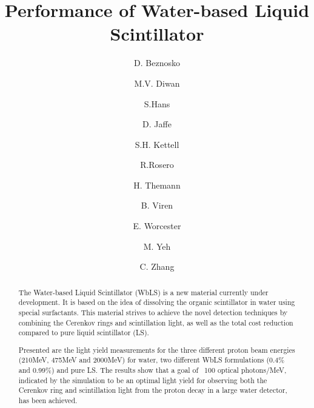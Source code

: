 \documentclass[preprint,12pt]{elsarticle}
\begin{document}
\begin{frontmatter}






\title{Performance of Water-based Liquid Scintillator}

 \author[label1]{D. Beznosko}
\author[label2]{M.V. Diwan}
\author[label3]{S.Hans}
\author[label2]{D. Jaffe}
\author[label2]{S.H. Kettell}
\author[label3]{R.Rosero}
\author[label2]{H. Themann}
\author[label2]{B. Viren}
\author[label2]{E. Worcester}
\author[label3]{M. Yeh}
\author[label2]{C. Zhang}
\address[label2]{Physics Department, Brookhaven National Laboratory, Upton, NY 11973, USA }
\address[label3]{Chemistry Department, Brookhaven National Laboratory, Upton, NY 11973, USA }
\address[label1]{Department of Physics, Nazarbayev University, Astana, 010000, KZ }





\begin{abstract}

	The Water-based Liquid Scintillator (WbLS) is a new material currently under development. It is based on the idea of dissolving the organic scintillator in water using special surfactants. This material strives to achieve the novel detection techniques by combining the Cerenkov rings and scintillation light, as well as the total cost reduction compared to pure liquid scintillator (LS).

	Presented are the light yield measurements for the three different proton beam energies (210MeV, 475MeV and 2000MeV) for water, two different WbLS formulations (0.4$\%$ and 0.99$\%$) and pure LS. The results show that a goal of ~100 optical photons/MeV, indicated by the simulation to be an optimal light yield for observing both the Cerenkov ring and scintillation light from the proton decay in a large water detector, has been achieved.


\end{abstract}
\end{frontmatter}
\end{document}

